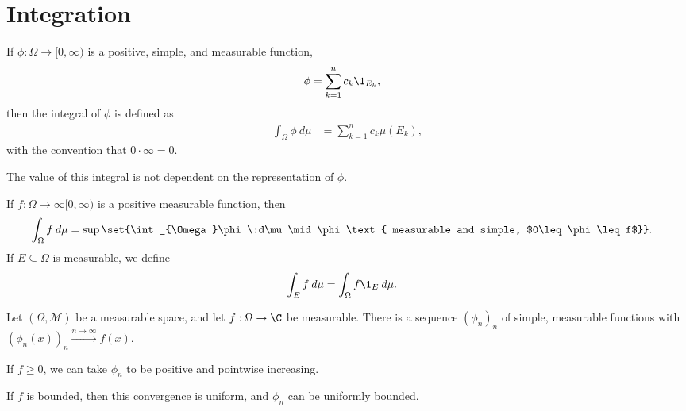 \section{Integration}%
\begin{definition}
  If $\phi: \Omega\rightarrow [0,\infty)$ is a positive, simple, and measurable function, 
  \begin{align*}
    \phi &= \sum_{k=1}^{n}c_k\1_{E_k},
  \end{align*}
  then the integral of $\phi$ is defined as
  \begin{align*}
    \int_{\Omega}\phi\:d\mu &= \sum_{k=1}^{n}c_k\mu\left(E_k\right),
  \end{align*}
  with the convention that $0\cdot \infty = 0$.\newline
   
  The value of this integral is not dependent on the representation of $\phi$.
\end{definition}
\begin{definition}
  If $f: \Omega\rightarrow\infty [0,\infty)$ is a positive measurable function, then
  \begin{align*}
    \int_{\Omega}f\:d\mu &= \sup\set{\int_{\Omega}\phi\:d\mu\mid \phi\text{ measurable and simple, $0\leq \phi \leq f$}}.
  \end{align*}
  If $E\subseteq \Omega$ is measurable, we define
  \begin{align*}
    \int_{E} f\:d\mu &= \int_{\Omega}f\1_{E}\:d\mu.
  \end{align*}
\end{definition}
\begin{proposition}
  Let $\left(\Omega,\mathcal{M}\right)$ be a measurable space, and let $f:\Omega\rightarrow \C$ be measurable. There is a sequence $\left(\phi_{n}\right)_n$ of simple, measurable functions with $\left(\phi_{n}\left(x\right)\right)_{n}\xrightarrow{n\rightarrow\infty}f(x)$.\newline

  If $f\geq 0$, we can take $\phi_n$ to be positive and pointwise increasing.\newline

  If $f$ is bounded, then this convergence is uniform, and $\phi_{n}$ can be uniformly bounded.
\end{proposition}

